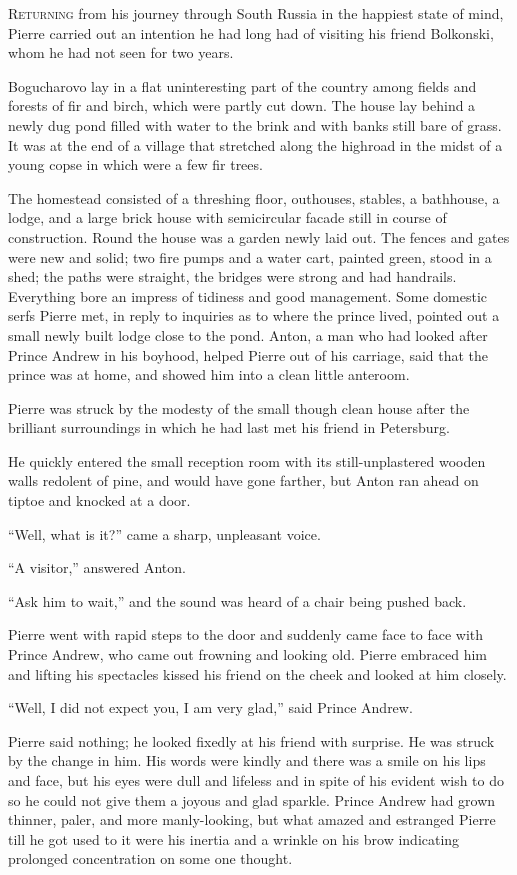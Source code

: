 \lettrine[lines=2, loversize=0.3, lraise=0]{\initfamily R}{eturning}
from his journey through South Russia in the happiest
state of mind, Pierre carried out an intention he had long had of
visiting his friend Bolkonski, whom he had not seen for two
years.

Bogucharovo lay in a flat uninteresting part of the country among
fields and forests of fir and birch, which were partly cut
down. The house lay behind a newly dug pond filled with water to
the brink and with banks still bare of grass. It was at the end
of a village that stretched along the highroad in the midst of a
young copse in which were a few fir trees.

The homestead consisted of a threshing floor, outhouses, stables,
a bathhouse, a lodge, and a large brick house with semicircular
facade still in course of construction. Round the house was a
garden newly laid out. The fences and gates were new and solid;
two fire pumps and a water cart, painted green, stood in a shed;
the paths were straight, the bridges were strong and had
handrails. Everything bore an impress of tidiness and good
management. Some domestic serfs Pierre met, in reply to inquiries
as to where the prince lived, pointed out a small newly built
lodge close to the pond. Anton, a man who had looked after Prince
Andrew in his boyhood, helped Pierre out of his carriage, said
that the prince was at home, and showed him into a clean little
anteroom.

Pierre was struck by the modesty of the small though clean house
after the brilliant surroundings in which he had last met his
friend in Petersburg.

He quickly entered the small reception room with its
still-unplastered wooden walls redolent of pine, and would have
gone farther, but Anton ran ahead on tiptoe and knocked at a
door.

``Well, what is it?'' came a sharp, unpleasant voice.

``A visitor,'' answered Anton.

``Ask him to wait,'' and the sound was heard of a chair being
pushed back.

Pierre went with rapid steps to the door and suddenly came face
to face with Prince Andrew, who came out frowning and looking
old. Pierre embraced him and lifting his spectacles kissed his
friend on the cheek and looked at him closely.

``Well, I did not expect you, I am very glad,'' said Prince
Andrew.

Pierre said nothing; he looked fixedly at his friend with
surprise. He was struck by the change in him. His words were
kindly and there was a smile on his lips and face, but his eyes
were dull and lifeless and in spite of his evident wish to do so
he could not give them a joyous and glad sparkle. Prince Andrew
had grown thinner, paler, and more manly-looking, but what amazed
and estranged Pierre till he got used to it were his inertia and
a wrinkle on his brow indicating prolonged concentration on some
one thought.

